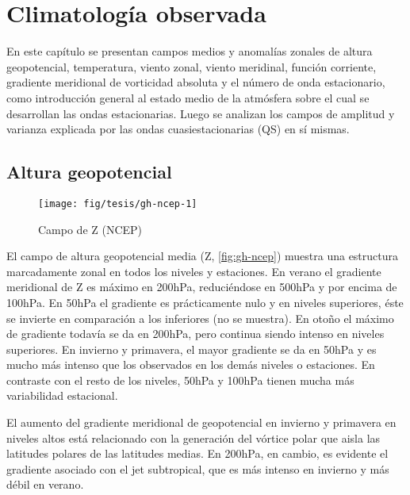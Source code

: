 \documentclass[spanish,a4paper,12p]{book}
\begin{document}
\chapter{Climatología observada}\label{climatologia-observada}

En este capítulo se presentan campos medios y anomalías zonales de
altura geopotencial, temperatura, viento zonal, viento meridinal,
función corriente, gradiente meridional de vorticidad absoluta y el
número de onda estacionario, como introducción general al estado medio
de la atmósfera sobre el cual se desarrollan las ondas estacionarias.
Luego se analizan los campos de amplitud y varianza explicada por las
ondas cuasiestacionarias (QS) en sí mismas.

\section{Altura geopotencial}\label{altura-geopotencial}

\begin{landscape}\begin{figure}

{\centering \texttt{[image: fig/tesis/gh-ncep-1]} 

}

\caption{Campo de Z (NCEP)}\label{fig:gh-ncep}
\end{figure}
\end{landscape}

El campo de altura geopotencial media (Z, \autoref{fig:gh-ncep}) muestra
una estructura marcadamente zonal en todos los niveles y estaciones. En
verano el gradiente meridional de Z es máximo en 200hPa, reduciéndose en
500hPa y por encima de 100hPa. En 50hPa el gradiente es prácticamente
nulo y en niveles superiores, éste se invierte en comparación a los
inferiores (no se muestra). En otoño el máximo de gradiente todavía se
da en 200hPa, pero continua siendo intenso en niveles superiores. En
invierno y primavera, el mayor gradiente se da en 50hPa y es mucho más
intenso que los observados en los demás niveles o estaciones. En
contraste con el resto de los niveles, 50hPa y 100hPa tienen mucha más
variabilidad estacional.

El aumento del gradiente meridional de geopotencial en invierno y
primavera en niveles altos está relacionado con la generación del
vórtice polar que aisla las latitudes polares de las
latitudes medias. En 200hPa, en cambio, es evidente el gradiente
asociado con el jet subtropical, que es más intenso en invierno y más
débil en verano.
\end{document}
